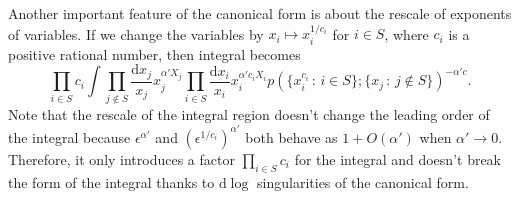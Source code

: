 \documentclass[12pt]{article}
\theoremstyle{definition}
\theoremstyle{plain}
\newcommand{\dif}{\mathrm{d}} %
\begin{document}


Another important feature of the canonical form is about the rescale of exponents of variables.
If we change the variables by
\(
	x_i\mapsto x_i^{1/c_i}
\)
for $i\in S$, where $c_i$ is a positive rational number, then integral becomes
\[
	\prod_{i\in S}c_i\int
	\prod_{j\not\in S}\frac{\dif x_j}{x_j}x_j^{\alpha' X_j}
	\prod_{i\in S}\frac{\dif x_i}{x_i}x_i^{\alpha' c_iX_i}
	p(\{x_i^{c_i}\,:\, i\in S\};\{x_j\,:\, j\not\in S\})^{-\alpha' c}.
\]
Note that the rescale of the integral region doesn't change the leading order of the integral
because $\epsilon^{\alpha'}$ and $(\epsilon^{1/c_i})^{\alpha'}$ both behave as $1+O(\alpha')$
when $\alpha'\to 0$. Therefore, it only introduces a factor $\prod_{i\in S}c_i$ 
for the integral and doesn't break the form of the integral 
thanks to $\dif \log$ singularities of the canonical form.
\end{document}
